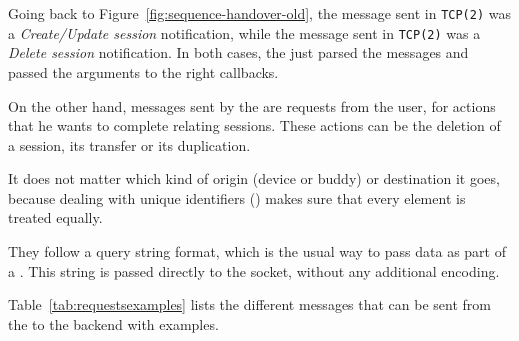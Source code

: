 Going back to Figure~\vref{fig:sequence-handover-old}, the message sent in \texttt{TCP(2)} was a \emph{Create/Update session} notification, while the message sent in \texttt{TCP(2)} was a \emph{Delete session} notification.
In both cases, the  just parsed the messages and passed the arguments to the right  callbacks.

On the other hand, messages sent by the  are requests from the user, for actions that he wants to complete relating sessions.
These actions can be the deletion of a session, its transfer or its duplication.

It does not matter which kind of origin (device or buddy) or destination it goes, because dealing with unique  identifiers () makes sure that every element is treated equally.

They follow a query string format, which is the usual way to pass data as part of a .
This string is passed directly to the  socket, without any additional encoding.

Table~\vref{tab:requestsexamples} lists the different messages that can be sent from the  to the  backend with examples.

